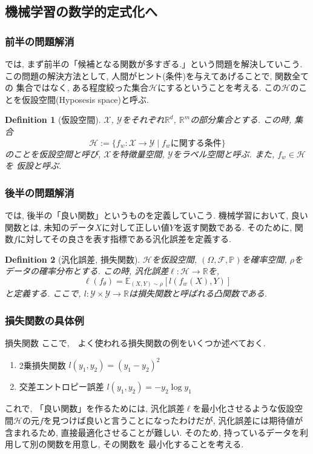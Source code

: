 \documentclass[dvipdfmx,11pt]{beamer}		%
\newtheorem{defi}{Definition}
\newcommand{\R}{\mathbb{R}}
\newcommand{\X}{\mathcal{X}}
\newcommand{\Y}{\mathcal{Y}}
\newcommand{\Hil}{\mathcal{H}}
\begin{document}
    \subsection{機械学習の数学的定式化へ}
    \begin{frame}\frametitle{前半の問題解消}
        では, まず前半の「候補となる関数が多すぎる.」という問題を解決していこう. \\ \indent
        この問題の解決方法として, 人間がヒント(条件)を与えてあげることで, 関数全ての
        集合ではなく, ある程度絞った集合$\Hil$にするということを考える. この$\Hil$のことを仮設空間(Hyposesis space)と呼ぶ.
        \begin{defi}[仮設空間]
            $\X$, $\Y$をそれぞれ$\R^d$, $\R^m$の部分集合とする. この時, 集合
            \begin{equation*}
                \Hil :=\{f_{w} :\X\to\Y\mid\text{$f_{w}$に関する条件}\}
            \end{equation*}
            のことを仮設空間と呼び, $\X$を特徴量空間, $\Y$をラベル空間と呼ぶ. また, $f_w\in\Hil$を
            仮設と呼ぶ. 
        \end{defi}
    \end{frame}
    \begin{frame}\frametitle{後半の問題解消}
        では, 後半の「良い関数」というものを定義していこう. 
        機械学習において, 良い関数とは, 未知のデータ$X$に対して正しい値$Y$を返す関数である. 
        そのために, 関数$f$に対してその良さを表す指標である汎化誤差を定義する.
        \begin{defi}[汎化誤差, 損失関数]
            $\Hil$を仮設空間, $(\Omega, \mathcal{F}, \mathbb{P})$を確率空間, $\rho$をデータの確率分布とする.
            この時, 汎化誤差$\ell:\Hil\to\R$を, 
            \begin{equation*}
                \ell(f_{\theta}) = \mathbb{E}_{(X, Y)\sim\rho}[l(f_{w}(X), Y)]
            \end{equation*}
            と定義する. ここで, $l:\Y\times\Y\to\R$は損失関数と呼ばれる凸関数である. 
        \end{defi}
    \end{frame}
    \begin{frame}
        \frametitle{損失関数の具体例}
        \begin{block}{損失関数}
            ここで,　よく使われる損失関数の例をいくつか述べておく. 
            \begin{enumerate}
                \item 2乗損失関数 $l(y_1, y_2) = (y_1 - y_2)^2$
                \item 交差エントロピー誤差 $l(y_1, y_2) = -y_2\log y_1$
            \end{enumerate}
        \end{block}
        これで, 「良い関数」を作るためには, 汎化誤差$\ell$を最小化させるような仮設空間$\Hil$の元$f$を見つけば良いと言うことになったわけだが, 
        汎化誤差には期待値が含まれるため, 直接最適化させることが難しい. そのため, 持っているデータを利用して別の関数を用意し, その関数を
        最小化することを考える. 
    \end{frame}
\end{document}
